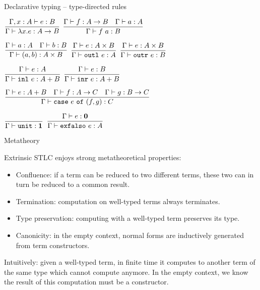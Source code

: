 \documentclass{beamer}
\newcommand{\Fun}[2]{#1 \to #2}
\newcommand{\Prod}[2]{#1 \times #2}
\newcommand{\Sum}[2]{#1 + #2}
\newcommand{\Unit}{\textbf{1}}
\newcommand{\Empty}{\textbf{0}}
\newcommand{\fun}[2]{\lambda #1. #2}
\newcommand{\app}[2]{#1\ #2}
\newcommand{\pair}[2]{(#1, #2)}
\newcommand{\outl}[1]{\texttt{outl}\ #1}
\newcommand{\outr}[1]{\texttt{outr}\ #1}
\newcommand{\inl}[1]{\texttt{inl}\ #1}
\newcommand{\inr}[1]{\texttt{inr}\ #1}
\newcommand{\case}[3]{\texttt{case}\ #1\ \texttt{of}\ (#2, #3)}
\newcommand{\unit}{\texttt{unit}}
\newcommand{\exfalso}[1]{\texttt{exfalso}\ #1}
\newcommand{\fulltyping}[3]{#1 \vdash #2 : #3}
\newcommand{\typing}[2]{\fulltyping{\Gamma}{#1}{#2}}
\newcommand{\rulename}[1]{\textsc{\footnotesize{#1}}}
\newcommand{\infrule}[3][]{\displaystyle \frac{#2}{#3} \rulename{#1}}
\newcommand{\extend}[3]{#1, #2 : #3}
\begin{document}
\begin{frame}{Declarative typing -- type-directed rules}

\begin{center}
  $\infrule{\fulltyping{\extend{\Gamma}{x}{A}}{e}{B}}{\typing{\fun{x}{e}}{\Fun{A}{B}}}$ \quad
  $\infrule{\typing{f}{\Fun{A}{B}} \quad \typing{a}{A}}{\typing{\app{f}{a}}{B}}$

  \vspace{2em}

  $\infrule{\typing{a}{A} \quad \typing{b}{B}}{\typing{\pair{a}{b}}{\Prod{A}{B}}}$ \quad
  $\infrule{\typing{e}{\Prod{A}{B}}}{\typing{\outl{e}}{A}}$ \quad
  $\infrule{\typing{e}{\Prod{A}{B}}}{\typing{\outr{e}}{B}}$

  \vspace{2em}

  $\infrule{\typing{e}{A}}{\typing{\inl{e}}{\Sum{A}{B}}}$ \quad
  $\infrule{\typing{e}{B}}{\typing{\inr{e}}{\Sum{A}{B}}}$

  \vspace{2em}

  $\infrule{\typing{e}{\Sum{A}{B}} \quad \typing{f}{\Fun{A}{C}} \quad \typing{g}{\Fun{B}{C}}}{\typing{\case{e}{f}{g}}{C}}$

  \vspace{2em}

  $\infrule{}{\typing{\unit}{\Unit}}$ \quad
  $\infrule{\typing{e}{\Empty}}{\typing{\exfalso{e}}{A}}$
\end{center}

\end{frame}

\begin{frame}{Metatheory}

Extrinsic STLC enjoys strong metatheoretical properties:

\begin{itemize}
  \item Confluence: if a term can be reduced to two different terms, these two can in turn be reduced to a common result.
  \item Termination: computation on well-typed terms always terminates.
  \item Type preservation: computing with a well-typed term preserves its type.
  \item Canonicity: in the empty context, normal forms are inductively generated from term constructors.
\end{itemize}

Intuitively: given a well-typed term, in finite time it computes to another term of the same type which cannot compute anymore. In the empty context, we know the result of this computation must be a constructor.

\end{frame}
\end{document}
